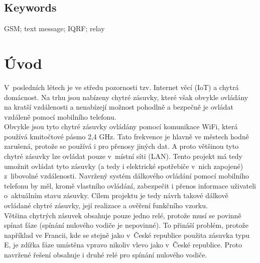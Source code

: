\documentclass[12pt,a4paper,oneside]{article}
\begin{document}
\subsection*{Keywords}

GSM; text message; IQRF; relay

\newpage

\setcounter{page}{1}

\tableofcontents

\newpage

\pagestyle{plain}

\section*{Úvod}


V~posledních létech je ve středu pozornosti tzv. Internet věcí (IoT) a chytrá domácnost. Na trhu jsou nabízeny chytré zásuvky, které však obvykle ovládány na kratší vzdálenosti a nenabízejí možnost pohodlně a bezpečně je ovládat vzdáleně pomocí mobilního telefonu. \\

Obvykle jsou tyto chytré zásuvky ovládány pomocí komunikace WiFi, která používá kmitočtové pásmo 2,4 GHz. Tato frekvence je hlavně ve městech hodně zarušená, protože se používá i pro přenosy jiných dat\cite{wiki/ism-band}. A proto většinou tyto chytré zásuvky lze ovládat pouze v~místní síti (LAN). Tento projekt má tedy umožnit ovládat tyto zásuvky (a tedy i elektrické spotřebiče v~nich zapojené) z~libovolné vzdálenosti. Navržený systém dálkového ovládání pomocí mobilního telefonu by měl, kromě vlastního ovládání, zabezpečit i přenos informace uživateli o~aktuálním stavu zásuvky. Cílem projektu je tedy návrh takové dálkově ovládané chytré zásuvky, její realizace a ověření funkčního vzorku. \\

Většina chytrých zásuvek obsahuje pouze jedno relé\cite{teardown-wemo-switch}, protože musí se povinně spínat fáze (spínání nulového vodiče je nepovinné). To přináší problém, protože například ve Francii, kde se stejně jako v~České republice použita zásuvka typu E\cite{zasuvka-typ-e}, je zdířka fáze umístěna vpravo nikoliv vlevo jako v~České republice\cite{faze-vlevo-nebo-vpravo}. Proto navržené řešení obsahuje i druhé relé pro spínání nulového vodiče. \\
\end{document}
